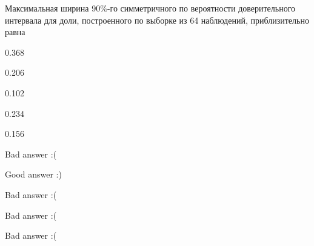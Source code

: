 
\begin{question}
Максимальная ширина 90\%-го симметричного по вероятности доверительного
интервала для доли, построенного по выборке из 64 наблюдений,
приблизительно равна
\begin{answerlist}
  \item 0.368
  \item 0.206
  \item 0.102
  \item 0.234
  \item 0.156
\end{answerlist}
\end{question}

\begin{solution}
\begin{answerlist}
  \item Bad answer :(
  \item Good answer :)
  \item Bad answer :(
  \item Bad answer :(
  \item Bad answer :(
\end{answerlist}
\end{solution}

